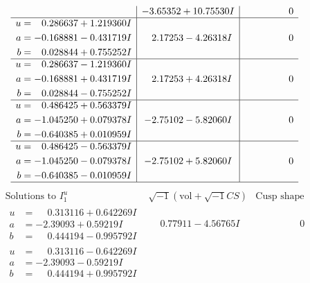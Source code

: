 \documentclass[1p]{elsarticle_modified}
\theoremstyle{definition}
\newcommand{\I}{\sqrt{-1}}
\begin{document}
$$\begin{array}{c|c|c}
 & -3.65352 + 10.75530 I & \phantom{-0.000000 } 0 \\ \hline\begin{aligned}
u &= \phantom{-}0.286637 + 1.219360 I \\
a &= -0.168881 - 0.431719 I \\
b &= \phantom{-}0.028844 + 0.755252 I\end{aligned}
 & \phantom{-}2.17253 - 4.26318 I & \phantom{-0.000000 } 0 \\ \hline\begin{aligned}
u &= \phantom{-}0.286637 - 1.219360 I \\
a &= -0.168881 + 0.431719 I \\
b &= \phantom{-}0.028844 - 0.755252 I\end{aligned}
 & \phantom{-}2.17253 + 4.26318 I & \phantom{-0.000000 } 0 \\ \hline\begin{aligned}
u &= \phantom{-}0.486425 + 0.563379 I \\
a &= -1.045250 + 0.079378 I \\
b &= -0.640385 + 0.010959 I\end{aligned}
 & -2.75102 - 5.82060 I & \phantom{-0.000000 } 0 \\ \hline\begin{aligned}
u &= \phantom{-}0.486425 - 0.563379 I \\
a &= -1.045250 - 0.079378 I \\
b &= -0.640385 - 0.010959 I\end{aligned}
 & -2.75102 + 5.82060 I & \phantom{-0.000000 } 0\\
 \hline 
 \end{array}$$\newpage$$\begin{array}{c|c|c}  
\text{Solutions to }I^u_{1}& \I (\text{vol} + \sqrt{-1}CS) & \text{Cusp shape}\\
 \hline 
\begin{aligned}
u &= \phantom{-}0.313116 + 0.642269 I \\
a &= -2.39093 + 0.59219 I \\
b &= \phantom{-}0.444194 - 0.995792 I\end{aligned}
 & \phantom{-}0.77911 - 4.56765 I & \phantom{-0.000000 } 0 \\ \hline\begin{aligned}
u &= \phantom{-}0.313116 - 0.642269 I \\
a &= -2.39093 - 0.59219 I \\
b &= \phantom{-}0.444194 + 0.995792 I\end{aligned}

\end{array}$$
\end{document}
